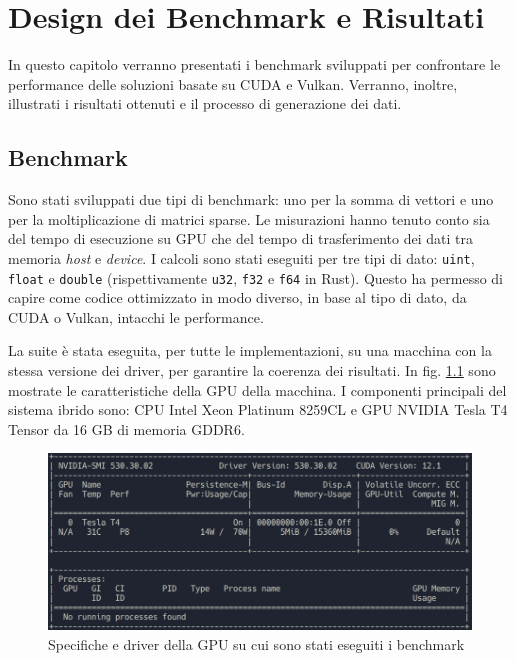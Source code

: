 \chapter{Design dei Benchmark e Risultati}
\label{sec:benchmark}

In questo capitolo verranno presentati i benchmark sviluppati per confrontare le performance delle soluzioni basate su \gls{CUDA} e Vulkan. Verranno, inoltre, illustrati i risultati ottenuti e il processo di generazione dei dati.

\section{Benchmark}

Sono stati sviluppati due tipi di benchmark: uno per la somma di vettori e uno per la moltiplicazione di matrici sparse. Le misurazioni hanno tenuto conto sia del tempo di esecuzione su \gls{GPU} che del tempo di trasferimento dei dati tra memoria \textit{host} e \textit{device}. I calcoli sono stati eseguiti per tre tipi di dato: \verb|uint|, \verb|float| e \verb|double| (rispettivamente \verb|u32|, \verb|f32| e \verb|f64| in Rust). Questo ha permesso di capire come codice ottimizzato in modo diverso, in base al tipo di dato, da \gls{CUDA} o Vulkan, intacchi le performance.

La suite è stata eseguita, per tutte le implementazioni, su una macchina con la stessa versione dei driver, per garantire la coerenza dei risultati. In fig. \ref{fig:macchina} sono mostrate le caratteristiche della \gls{GPU} della macchina. I componenti principali del sistema ibrido sono: \gls{CPU} Intel Xeon Platinum 8259CL e \gls{GPU} NVIDIA Tesla T4 Tensor da 16 GB di memoria GDDR6.

\begin{figure}[ht]
    \centering
    \includegraphics[width=.9\linewidth]{images/chapter4/macchina.png}
    \caption{Specifiche e driver della GPU su cui sono stati eseguiti i benchmark}
    \label{fig:macchina}
\end{figure}

